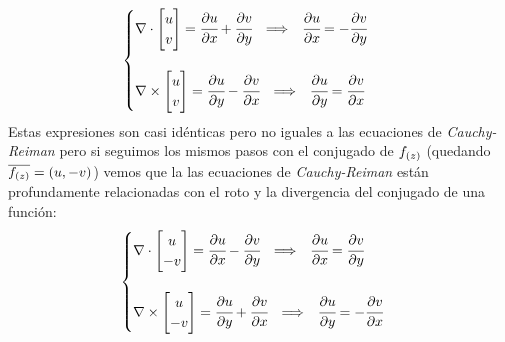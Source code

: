 \begin{equation}
    \begin{cases}
        \begin{aligned}
            \nabla & \cdot \begin{bmatrix}
                u \\
                v
            \end{bmatrix}
            =\cfrac{\partial u}{\partial x}+\cfrac{\partial v}{\partial y}\hspace{0.25cm} \Longrightarrow \hspace{0.25cm}  \cfrac{\partial u}{\partial x}=-\cfrac{\partial v}{\partial y}
        \end{aligned}\\
        \\
        \begin{aligned}
             \nabla \times  \begin{bmatrix}
                u \\
                v
            \end{bmatrix}
            =\cfrac{\partial u}{\partial y}-\cfrac{\partial v}{\partial x}\hspace{0.25cm} \Longrightarrow \hspace{0.25cm} \cfrac{\partial u}{\partial y}=\cfrac{\partial v}{\partial x}
            \end{aligned}
        \end{cases}
\end{equation}
Estas expresiones son casi idénticas pero no iguales a las ecuaciones de \textit{Cauchy-Reiman} pero si seguimos los mismos pasos con el conjugado de $f_{(z)}$ (quedando $\overline{f_{(z)}}=(u,-v)$) vemos que la las ecuaciones de \textit{Cauchy-Reiman} están profundamente relacionadas con el roto y la divergencia del conjugado de una función:
\begin{equation}
    \begin{cases}
        \begin{aligned}
            \nabla & \cdot \begin{bmatrix}
                u \\
                -v
            \end{bmatrix}
            =\cfrac{\partial u}{\partial x}-\cfrac{\partial v}{\partial y}\hspace{0.25cm} \Longrightarrow \hspace{0.25cm}  \cfrac{\partial u}{\partial x}=\cfrac{\partial v}{\partial y}
        \end{aligned}\\
        \\
        \begin{aligned}
             \nabla \times  \begin{bmatrix}
                u \\
                -v
            \end{bmatrix}
            =\cfrac{\partial u}{\partial y}+\cfrac{\partial v}{\partial x}\hspace{0.25cm} \Longrightarrow \hspace{0.25cm} \cfrac{\partial u}{\partial y}=-\cfrac{\partial v}{\partial x}
            \end{aligned}
        \end{cases}
\end{equation}
